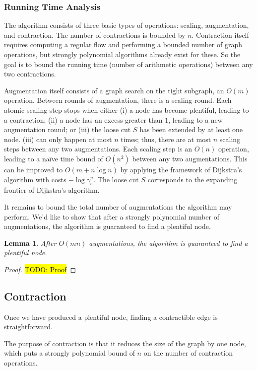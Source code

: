 \documentclass[11pt]{article}
\newtheorem{lemma}[theorem]{Lemma}
\theoremstyle{definition}
\theoremstyle{definition}
\newcommand{\todo}[1]{\hl{TODO: #1}}
\begin{document}
		\subsubsection{Running Time Analysis}
		The algorithm consists of three basic types of operations: scaling, augmentation, and contraction.
		The number of contractions is bounded by $n$. Contraction itself
		requires computing a regular flow and performing a bounded number of graph operations, but
		strongly polynomial algorithms already exist for these. So the goal is to bound the running time
		(number of arithmetic operations) between any two contractions.
		
		Augmentation itself consists of a graph search on the tight subgraph, an $O(m)$ operation.
		Between rounds of augmentation, there is a scaling round. Each atomic scaling step stops
		when either (i) a node has become plentiful, leading to a contraction; (ii) a node has an
		excess greater than $1$, leading to a new augmentation round; or (iii) the loose cut
		$S$ has been extended by at least one node. (iii) can only happen at most $n$ times; thus,
		there are at most $n$ scaling steps between any two augmentations. Each scaling step
		is an $O(n)$ operation, leading to a na\"ive time bound of $O(n^2)$ between any two augmentations.
		This can be improved to $O(m + n \log n)$ by applying the framework of Dijkstra's
		algorithm with costs $-\log \gamma^u_e$. The loose cut $S$ corresponds to the expanding
		frontier of Dijkstra's algorithm.
		
		It remains to bound the total number of augmentations the algorithm may perform. We'd
		like to show that after a strongly polynomial number of augmentations, the algorithm
		is guaranteed to find a plentiful node.
		
		\begin{lemma}
			After $O(mn)$ augmentations, the algorithm is guaranteed to find a plentiful node.
		\end{lemma}
		\begin{proof} \todo{Proof}	
		\end{proof}


	\subsection{Contraction}

	Once we have produced a plentiful node, finding a contractible edge is straightforward. 

	The purpose of contraction is that it reduces the size of the graph by one node,
	which puts a strongly polynomial bound of $n$ on the number of contraction
	operations.
\end{document}
